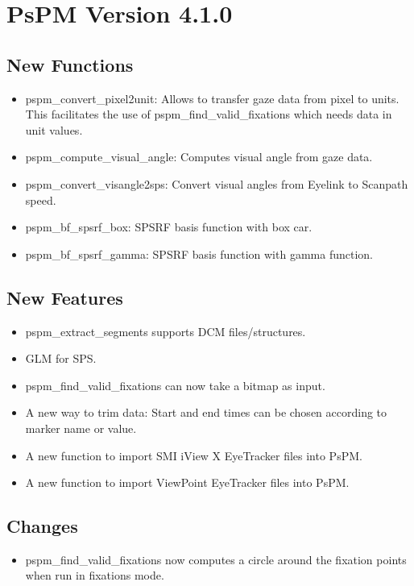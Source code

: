 \documentclass[english]{article}
\numberwithin{equation}{section}
\numberwithin{figure}{section}
\begin{document}
\section{PsPM Version 4.1.0}

\subsection*{New Functions}
\begin{itemize}
\item pspm\_convert\_pixel2unit: Allows to transfer gaze data from pixel
to units. This facilitates the use of pspm\_find\_valid\_fixations
which needs data in unit values.
\item pspm\_compute\_visual\_angle: Computes visual angle from gaze data.
\item pspm\_convert\_visangle2sps: Convert visual angles from Eyelink to
Scanpath speed.
\item pspm\_bf\_spsrf\_box: SPSRF basis function with box car.
\item pspm\_bf\_spsrf\_gamma: SPSRF basis function with gamma function.
\end{itemize}

\subsection*{New Features}
\begin{itemize}
\item pspm\_extract\_segments supports DCM files/structures.
\item GLM for SPS.
\item pspm\_find\_valid\_fixations can now take a bitmap as input.
\item A new way to trim data: Start and end times can be chosen according
to marker name or value.
\item A new function to import SMI iView X EyeTracker files into PsPM.
\item A new function to import ViewPoint EyeTracker files into PsPM.
\end{itemize}

\subsection*{Changes}
\begin{itemize}
\item pspm\_find\_valid\_fixations now computes a circle around the fixation
points when run in fixations mode.
\end{itemize}
\end{document}
